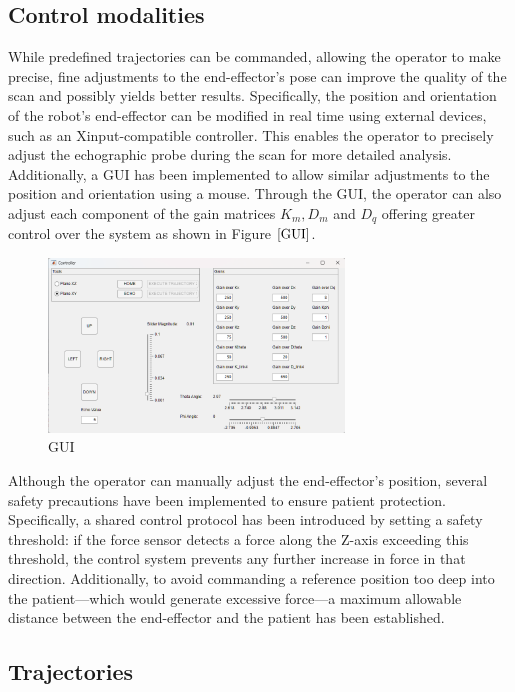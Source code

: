 \documentclass{article}
\begin{document}
\subsection{Control modalities}
While predefined trajectories can be commanded, allowing the operator to make precise, fine adjustments to the end-effector’s pose can improve the quality of the scan and possibly yields better results. Specifically, the position and orientation of the robot’s end-effector can be modified in real time using external devices, such as an Xinput-compatible controller. This enables the operator to precisely adjust the echographic probe during the scan for more detailed analysis.
\\
Additionally, a GUI has been implemented to allow similar adjustments to the position and orientation using a mouse. Through the GUI, the operator can also adjust each component of the gain matrices $K_{m}, D_{m}$ and $D_{q}$ offering greater control over the system as shown in Figure $\ref{GUI}$.
\begin{figure}[h]
    \centering
    \includegraphics[width=0.7\textwidth]{New_gui.png}  
    \caption{GUI}
    \label{GUI}
\end{figure}
\newline
Although the operator can manually adjust the end-effector’s position, several safety precautions have been implemented to ensure patient protection. Specifically, a shared control protocol has been introduced by setting a safety threshold: if the force sensor detects a force along the Z-axis exceeding this threshold, the control system prevents any further increase in force in that direction. Additionally, to avoid commanding a reference position too deep into the patient—which would generate excessive force—a maximum allowable distance between the end-effector and the patient has been established.

\subsection{Trajectories}
\end{document}

